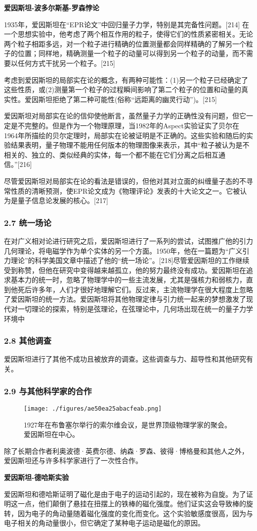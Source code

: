 \textbf{爱因斯坦-波多尔斯基-罗森悖论}

1935年，爱因斯坦在“EPR论文”中回归量子力学，特别是其完备性问题。[214] 在一个思想实验中，他考虑了两个相互作用的粒子，使得它们的性质紧密相关。无论两个粒子相距多远，对一个粒子进行精确的位置测量都会同样精确的了解另一个粒子的位置；同样地，精确测量一个粒子的动量可以得到另一个粒子的动量，而不需要以任何方式干扰另一个粒子。[215]

考虑到爱因斯坦的局部实在论的概念，有两种可能性：(1)另一个粒子已经确定了这些性质，或(2)测量第一个粒子的过程瞬间影响了第二个粒子的位置和动量的真实性。爱因斯坦拒绝了第二种可能性(俗称“远距离的幽灵行动”)。[215]

爱因斯坦对局部实在论的信仰使他断言，虽然量子力学的正确性没有问题，但它一定是不完整的。但是作为一个物理原理，当1982年的Aspect实验证实了贝尔在1964年所描绘的贝尔定理时，局部实在论被证明是不正确的。这些实验和随后的实验结果表明，量子物理不能用任何版本的物理图像来表示，其中“粒子被认为是不相关的、独立的、类似经典的实体，每一个都不能在它们分离之后相互通信。”[216]

尽管爱因斯坦对局部实在论的看法是错误的，但他对其对立面的纠缠量子态的不寻常性质的清晰预测，使EPR论文成为《物理评论》发表的十大论文之一。它被认为是量子信息论发展的核心。[217]

\subsubsection{2.7 统一场论}
在对广义相对论进行研究之后，爱因斯坦进行了一系列的尝试，试图推广他的引力几何理论，将电磁学作为单个实体的另一个方面。1950年，他在一篇题为“广义引力理论”的科学美国文章中描述了他的“统一场论”。[218]尽管爱因斯坦的工作继续受到称赞，但他在研究中变得越来越孤立，他的努力最终没有成功。爱因斯坦在追求基本力的统一时，忽略了物理学中的一些主流发展，尤其是强核力和弱核力，直到他死后许多年，人们才很好地理解它们。反过来，主流物理学在很大程度上忽略了爱因斯坦的统一方法。爱因斯坦将其他物理定律与引力统一起来的梦想激发了现代对一切理论的探索，特别是弦理论，在弦理论中，几何场出现在统一的量子力学环境中

\subsubsection{2.8 其他调查}
爱因斯坦进行了其他不成功且被放弃的调查。这些调查与力、超导性和其他研究有关。

\subsubsection{2.9 与其他科学家的合作}
\begin{figure}[ht]
\centering
\texttt{[image: ./figures/ae50ea25abacfeab.png]}
\caption{1927年在布鲁塞尔举行的索尔维会议，是世界顶级物理学家的聚会。爱因斯坦在中心。} \label{fig_AYST_23}
\end{figure}
除了长期合作者利奥波德·英费尔德、纳森·罗森、彼得·博格曼和其他人之外，爱因斯坦还与许多科学家进行了一次性合作。

\textbf{爱因斯坦-德哈斯实验}

爱因斯坦和德哈斯证明了磁化是由于电子的运动引起的，现在被称为自旋。为了证明这一点，他们颠倒了悬挂在扭摆上的铁棒的磁化强度。他们证实这会导致棒的旋转，因为电子的角动量随着磁化强度的变化而变化。这个实验敏感度很高，因为与电子相关的角动量很小，但它确定了某种电子运动是磁化的原因。